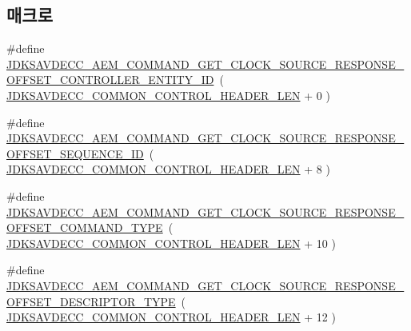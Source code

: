 \subsection*{매크로}
\begin{DoxyCompactItemize}
\item 
\#define \hyperlink{group__command__get__clock__source__response_ga000b7b6c6050e4891fa1b8ca15dcc02d}{J\+D\+K\+S\+A\+V\+D\+E\+C\+C\+\_\+\+A\+E\+M\+\_\+\+C\+O\+M\+M\+A\+N\+D\+\_\+\+G\+E\+T\+\_\+\+C\+L\+O\+C\+K\+\_\+\+S\+O\+U\+R\+C\+E\+\_\+\+R\+E\+S\+P\+O\+N\+S\+E\+\_\+\+O\+F\+F\+S\+E\+T\+\_\+\+C\+O\+N\+T\+R\+O\+L\+L\+E\+R\+\_\+\+E\+N\+T\+I\+T\+Y\+\_\+\+ID}~( \hyperlink{group__jdksavdecc__avtp__common__control__header_gaae84052886fb1bb42f3bc5f85b741dff}{J\+D\+K\+S\+A\+V\+D\+E\+C\+C\+\_\+\+C\+O\+M\+M\+O\+N\+\_\+\+C\+O\+N\+T\+R\+O\+L\+\_\+\+H\+E\+A\+D\+E\+R\+\_\+\+L\+EN} + 0 )
\item 
\#define \hyperlink{group__command__get__clock__source__response_ga15b3cf7496b43d2fc3af619d63bdd554}{J\+D\+K\+S\+A\+V\+D\+E\+C\+C\+\_\+\+A\+E\+M\+\_\+\+C\+O\+M\+M\+A\+N\+D\+\_\+\+G\+E\+T\+\_\+\+C\+L\+O\+C\+K\+\_\+\+S\+O\+U\+R\+C\+E\+\_\+\+R\+E\+S\+P\+O\+N\+S\+E\+\_\+\+O\+F\+F\+S\+E\+T\+\_\+\+S\+E\+Q\+U\+E\+N\+C\+E\+\_\+\+ID}~( \hyperlink{group__jdksavdecc__avtp__common__control__header_gaae84052886fb1bb42f3bc5f85b741dff}{J\+D\+K\+S\+A\+V\+D\+E\+C\+C\+\_\+\+C\+O\+M\+M\+O\+N\+\_\+\+C\+O\+N\+T\+R\+O\+L\+\_\+\+H\+E\+A\+D\+E\+R\+\_\+\+L\+EN} + 8 )
\item 
\#define \hyperlink{group__command__get__clock__source__response_ga342db2351dc5bed6cb308f248635b673}{J\+D\+K\+S\+A\+V\+D\+E\+C\+C\+\_\+\+A\+E\+M\+\_\+\+C\+O\+M\+M\+A\+N\+D\+\_\+\+G\+E\+T\+\_\+\+C\+L\+O\+C\+K\+\_\+\+S\+O\+U\+R\+C\+E\+\_\+\+R\+E\+S\+P\+O\+N\+S\+E\+\_\+\+O\+F\+F\+S\+E\+T\+\_\+\+C\+O\+M\+M\+A\+N\+D\+\_\+\+T\+Y\+PE}~( \hyperlink{group__jdksavdecc__avtp__common__control__header_gaae84052886fb1bb42f3bc5f85b741dff}{J\+D\+K\+S\+A\+V\+D\+E\+C\+C\+\_\+\+C\+O\+M\+M\+O\+N\+\_\+\+C\+O\+N\+T\+R\+O\+L\+\_\+\+H\+E\+A\+D\+E\+R\+\_\+\+L\+EN} + 10 )
\item 
\#define \hyperlink{group__command__get__clock__source__response_ga3ce197557899eb022e9bb35b3064a0f4}{J\+D\+K\+S\+A\+V\+D\+E\+C\+C\+\_\+\+A\+E\+M\+\_\+\+C\+O\+M\+M\+A\+N\+D\+\_\+\+G\+E\+T\+\_\+\+C\+L\+O\+C\+K\+\_\+\+S\+O\+U\+R\+C\+E\+\_\+\+R\+E\+S\+P\+O\+N\+S\+E\+\_\+\+O\+F\+F\+S\+E\+T\+\_\+\+D\+E\+S\+C\+R\+I\+P\+T\+O\+R\+\_\+\+T\+Y\+PE}~( \hyperlink{group__jdksavdecc__avtp__common__control__header_gaae84052886fb1bb42f3bc5f85b741dff}{J\+D\+K\+S\+A\+V\+D\+E\+C\+C\+\_\+\+C\+O\+M\+M\+O\+N\+\_\+\+C\+O\+N\+T\+R\+O\+L\+\_\+\+H\+E\+A\+D\+E\+R\+\_\+\+L\+EN} + 12 )

\end{DoxyCompactItemize}
